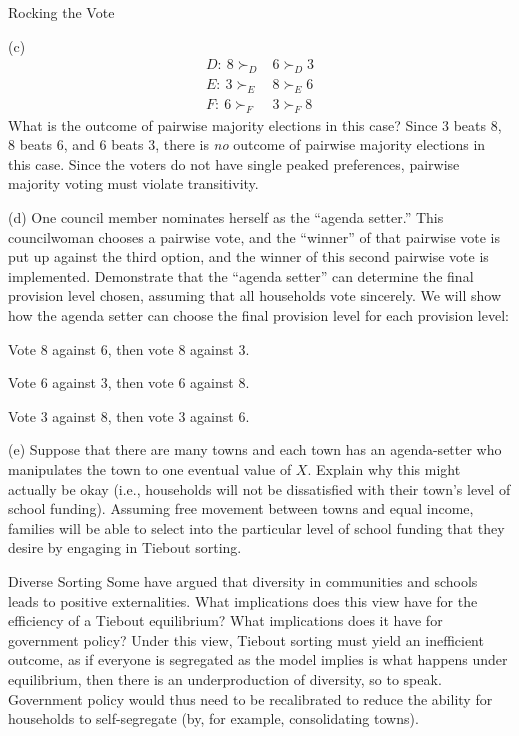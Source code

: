 \documentclass[8pt]{extarticle}
\begin{document}
\begin{problem}{Rocking the Vote}
\begin{problem}{(c)}
      \begin{align*}
        D:~8 \succ_D &6 \succ_D 3\\
        E:~3\succ_E &8 \succ_E 6\\
        F:~6\succ_F &3 \succ_F 8
      \end{align*}
      What is the outcome of pairwise majority elections in this case?
      \tcblower
      Since $3$ beats $8$, $8$ beats $6$, and $6$ beats $3$, there is \textit{no} outcome of pairwise majority elections in this case. Since the voters do not have single peaked preferences, pairwise majority voting must violate transitivity.
    \end{problem}
    \begin{problem}{(d)}
      One council member nominates herself as the ``agenda setter.'' This councilwoman chooses a pairwise vote, and the ``winner'' of that pairwise vote is put up against the third option, and the winner of this second pairwise vote is implemented. Demonstrate that the ``agenda setter'' can determine the final provision level chosen, assuming that all households vote sincerely.
      \tcblower
      We will show how the agenda setter can choose the final provision level for each provision level:
      \begin{description}[font=\normalfont]
        \item[Provision Level 3:] Vote $8$ against $6$, then vote $8$ against $3$.
        \item[Provision Level 8:] Vote $6$ against $3$, then vote $6$ against $8$.
        \item[Provision level 6:] Vote $3$ against $8$, then vote $3$ against $6$.
      \end{description}
    \end{problem}
    \begin{problem}{(e)}
      Suppose that there are many towns and each town has an agenda-setter who manipulates the town to one eventual value of $X$. Explain why this might actually be okay (i.e., households will not be dissatisfied with their town's level of school funding).
      \tcblower
      Assuming free movement between towns and equal income, families will be able to select into the particular level of school funding that they desire by engaging in Tiebout sorting.
    \end{problem}
  \end{problem}
  \begin{problem}{Diverse Sorting}
    Some have argued that diversity in communities and schools leads to positive externalities. What implications does this view have for the efficiency of a Tiebout equilibrium? What implications does it have for government policy?
    \tcblower
    Under this view, Tiebout sorting must yield an inefficient outcome, as if everyone is segregated as the model implies is what happens under equilibrium, then there is an underproduction of diversity, so to speak. Government policy would thus need to be recalibrated to reduce the ability for households to self-segregate (by, for example, consolidating towns).
  \end{problem}
\end{document}
